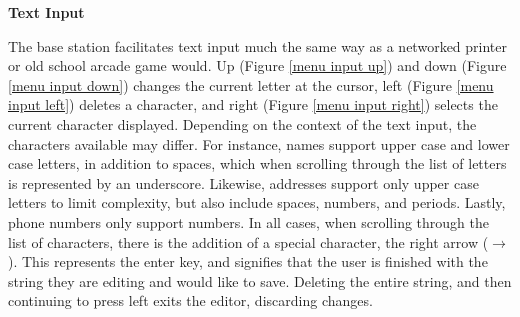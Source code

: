 \documentclass[journal,compsoc]{IEEEtran}
\begin{document}
\textbf{Text Input}

The base station facilitates text input much the same way as a networked printer or old school arcade game would. Up (Figure \ref{menu input up}) and down (Figure \ref{menu input down}) changes the current letter at the cursor, left (Figure \ref{menu input left}) deletes a character, and right (Figure \ref{menu input right}) selects the current character displayed. Depending on the context of the text input, the characters available may differ. For instance, names support upper case and lower case letters, in addition to spaces, which when scrolling through the list of letters is represented by an underscore. Likewise, addresses support only upper case letters to limit complexity, but also include spaces, numbers, and periods. Lastly, phone numbers only support numbers. In all cases, when scrolling through the list of characters, there is the addition of a special character, the right arrow ($\rightarrow$). This represents the enter key, and signifies that the user is finished with the string they are editing and would like to save. Deleting the entire string, and then continuing to press left exits the editor, discarding changes.
\end{document}
